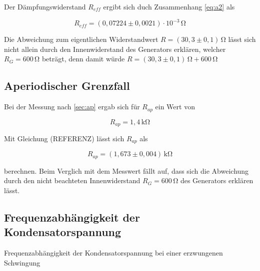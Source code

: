 \noindent Der Dämpfungswiderstand $R_{eff}$ ergibt sich duch
Zusammenhang \ref{eq:a2} als

\begin{equation*}
  R_{eff}=(0,07224\pm0,0021)\cdot10^{-3}\,\si{\ohm}
\end{equation*}

\noindent Die Abweichung zum eigentlichen Widerstandwert $R=(30,3 \pm 0,1)\,\si{\ohm}$
lässt sich nicht allein durch den Innenwiderstand des Generators erklären,
welcher $R_G=600\,\si{\ohm}$ beträgt, denn damit würde $R=(30,3\pm0,1)\,\si{\ohm} + 600\,\si{\ohm}$





\subsection{Aperiodischer Grenzfall}
Bei der Messung nach \ref{sec:ap}
ergab sich für $R_{ap}$ ein Wert von

\begin{equation*}
  R_{ap}=1,4\,\si{\kilo\ohm}
\end{equation*}

\noindent Mit Gleichung (REFERENZ) lässt sich $R_{ap}$ 
als

\begin{equation*}
  R_{ap}=(1,673\pm0,004)\,\si{\kilo\ohm}
\end{equation*}

\noindent berechnen. Beim Verglich mit dem Messwert fällt 
auf, dass sich die Abweichung durch den nicht beachteten
Innenwiderstand $R_G=600\,\si{\ohm}$ des Generators erklären lässt.




\subsection{Frequenzabhängigkeit der Kondensatorspannung}

\begin{table}[H]
  \centering
  
  
  \caption{Frequenzabhängigkeit der Kondensatorspannung bei einer erzwungenen Schwingung}
  \label{tab:b}
\end{table}

